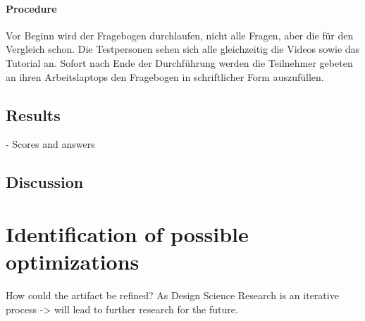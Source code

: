 \paragraph{Procedure}
Vor Beginn wird der Fragebogen durchlaufen, nicht alle Fragen, aber die für den Vergleich schon.
Die Testpersonen sehen sich alle gleichzeitig die Videos sowie das Tutorial an.
Sofort nach Ende der Durchführung werden die Teilnehmer gebeten an ihren Arbeitslaptops den Fragebogen in schriftlicher Form auszufüllen. 


\subsection{Results} \label{subsec:EvaluationResults}
- Scores and answers

\subsection{Discussion}

\section{Identification of possible optimizations} \label{sec:Optimizations}

How could the artifact be refined? As Design Science Research is an iterative process -> will lead to further research for the future.
